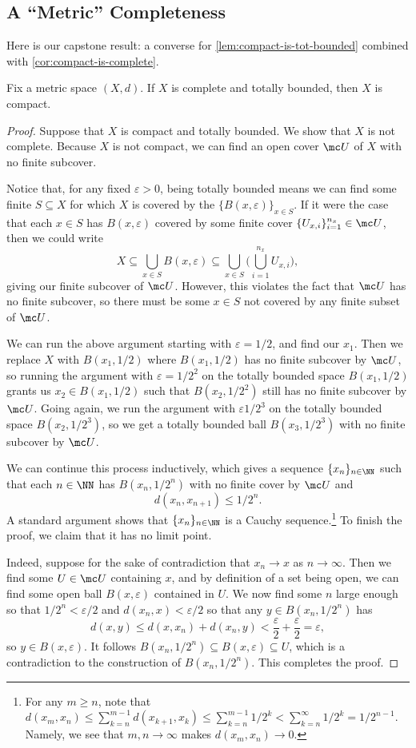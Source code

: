 \documentclass[../notes.tex]{subfiles}
\begin{document}
\subsection{A ``Metric'' Completeness}
Here is our capstone result: a converse for \autoref{lem:compact-is-tot-bounded} combined with \autoref{cor:compact-is-complete}.
\begin{theorem}
	Fix a metric space $(X,d)$. If $X$ is complete and totally bounded, then $X$ is compact.
\end{theorem}
\begin{proof}
	Suppose that $X$ is compact and totally bounded. We show that $X$ is not complete. Because $X$ is not compact, we can find an open cover $\mc U$ of $X$ with no finite subcover.
	
	Notice that, for any fixed $\varepsilon>0$, being totally bounded means we can find some finite $S\subseteq X$ for which $X$ is covered by the $\{B(x,\varepsilon)\}_{x\in S}$. If it were the case that each $x\in S$ has $B(x,\varepsilon)$ covered by some finite cover $\{U_{x,i}\}_{i=1}^{n_x}\in\mc U$, then we could write
	\[X\subseteq\bigcup_{x\in S}B(x,\varepsilon)\subseteq\bigcup_{x\in S}\Bigg(\bigcup_{i=1}^{n_x}U_{x,i}\Bigg),\]
	giving our finite subcover of $\mc U$. However, this violates the fact that $\mc U$ has no finite subcover, so there must be some $x\in S$ not covered by any finite subset of $\mc U$.

	We can run the above argument starting with $\varepsilon=1/2$, and find our $x_1$. Then we replace $X$ with $B(x_1,1/2)$ where $B(x_1,1/2)$ has no finite subcover by $\mc U$, so running the argument with $\varepsilon=1/2^2$ on the totally bounded space $B(x_1,1/2)$ grants us $x_2\in B(x_1,1/2)$ such that $B(x_2,1/2^2)$ still has no finite subcover by $\mc U$. Going again, we run the argument with $\varepsilon1/2^3$ on the totally bounded space $B(x_2,1/2^3)$, so we get a totally bounded ball $B(x_3,1/2^3)$ with no finite subcover by $\mc U$.
	
	We can continue this process inductively, which gives a sequence $\{x_n\}_{n\in\NN}$ such that each $n\in\NN$ has $B(x_n,1/2^n)$ with no finite cover by $\mc U$ and
	\[d(x_n,x_{n+1})\le 1/2^n.\]
	A standard argument shows that $\{x_n\}_{n\in\NN}$ is a Cauchy sequence.\footnote{For any $m\ge n$, note that $d(x_m,x_n)\le\sum_{k=n}^{m-1}d(x_{k+1},x_k)\le\sum_{k=n}^{m-1}1/2^k<\sum_{k=n}^\infty1/2^k=1/2^{n-1}$. Namely, we see that $m,n\to\infty$ makes $d(x_m,x_n)\to0$.} To finish the proof, we claim that it has no limit point.

	Indeed, suppose for the sake of contradiction that $x_n\to x$ as $n\to\infty$. Then we find some $U\in\mc U$ containing $x$, and by definition of a set being open, we can find some open ball $B(x,\varepsilon)$ contained in $U$. We now find some $n$ large enough so that $1/2^n<\varepsilon/2$ and $d(x_n,x)<\varepsilon/2$ so that any $y\in B(x_n,1/2^n)$ has
	\[d(x,y)\le d(x,x_n)+d(x_n,y)<\frac\varepsilon2+\frac\varepsilon2=\varepsilon,\]
	so $y\in B(x,\varepsilon)$. It follows $B(x_n,1/2^n)\subseteq B(x,\varepsilon)\subseteq U$, which is a contradiction to the construction of $B(x_n,1/2^n)$. This completes the proof.
\end{proof}
\end{document}
